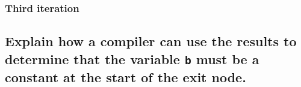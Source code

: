 

\subsubsection{Third iteration}
\renewcommand{\INBone}		{$\{d_4,~ d_6,~ d_7,~ d_8,~ d_9,~ d_{10},~ d_{12}\}$}
\renewcommand{\OUTBone}		{$\{d_1,~ d_2,~ d_3,~ d_4,~ d_7,~ d_9\}$}




\subsection{Explain how a compiler can use the results to determine that the variable \texttt{b} must be a constant at the start of the exit node.}
